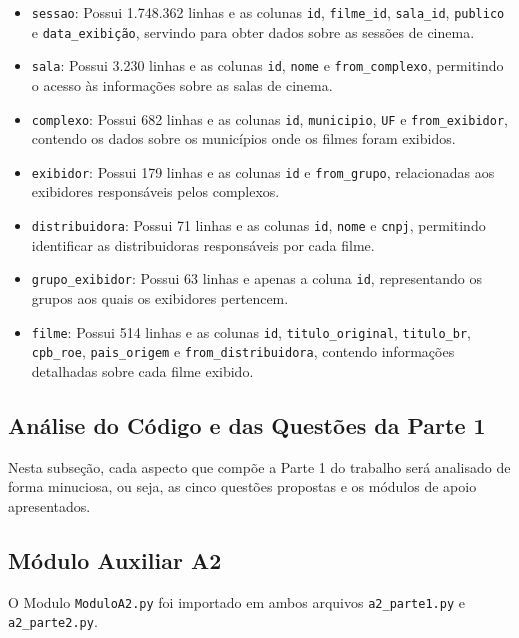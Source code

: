 \documentclass{article}
\begin{document}
\begin{itemize}
    \item \texttt{sessao}: Possui 1.748.362 linhas e as colunas \texttt{id}, \texttt{filme\_id}, \texttt{sala\_id}, \texttt{publico} e \texttt{data\_exibição}, servindo para obter dados sobre as sessões de cinema.

    \item \texttt{sala}: Possui 3.230 linhas e as colunas \texttt{id}, \texttt{nome} e \texttt{from\_complexo}, permitindo o acesso às informações sobre as salas de cinema.

    \item \texttt{complexo}: Possui 682 linhas e as colunas \texttt{id}, \texttt{municipio}, \texttt{UF} e \texttt{from\_exibidor}, contendo os dados sobre os municípios onde os filmes foram exibidos.

    \item \texttt{exibidor}: Possui 179 linhas e as colunas \texttt{id} e \texttt{from\_grupo}, relacionadas aos exibidores responsáveis pelos complexos.

    \item \texttt{distribuidora}: Possui 71 linhas e as colunas \texttt{id}, \texttt{nome} e \texttt{cnpj}, permitindo identificar as distribuidoras responsáveis por cada filme.

    \item \texttt{grupo\_exibidor}: Possui 63 linhas e apenas a coluna \texttt{id}, representando os grupos aos quais os exibidores pertencem.

    \item \texttt{filme}: Possui 514 linhas e as colunas \texttt{id}, \texttt{titulo\_original}, \texttt{titulo\_br}, \texttt{cpb\_roe}, \texttt{pais\_origem} e \texttt{from\_distribuidora}, contendo informações detalhadas sobre cada filme exibido.
\end{itemize}
\pagebreak
\subsection{Análise do Código e das Questões da Parte 1}
Nesta subseção, cada aspecto que compõe a Parte 1 do trabalho será analisado de forma minuciosa, ou seja, as cinco questões propostas e os módulos de apoio apresentados.
\subsection*{Módulo Auxiliar A2}
O Modulo \texttt{ModuloA2.py} foi importado em ambos arquivos \texttt{a2\_parte1.py} e \texttt{a2\_parte2.py}.
\end{document}
